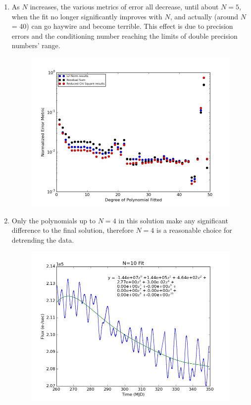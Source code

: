 \documentclass[10pt, preprint]{aastex}
\begin{document}
\begin{enumerate}
\item As $N$ increases, the various metrics of error all decrease, until about $N = 5$, when the fit no longer significantly improves with $N$, and actually (around $N$ = 40) can go haywire and become terrible. This effect is due to precision errors and the conditioning number reaching the limits of double precision numbers' range.
\begin{figure}[!ht]  \centering
  \includegraphics[width=5in]{hw4_fig3.png}
\end{figure}

\item  Only the polynomials up to $N=4$ in this solution make any significant difference to the final solution, therefore $N=4$ is a reasonable choice for detrending the data.
\begin{figure}[!ht]  \centering
  \includegraphics[width=5in]{hw4_fig4.png}
\end{figure}


\end{enumerate}
\end{document}
